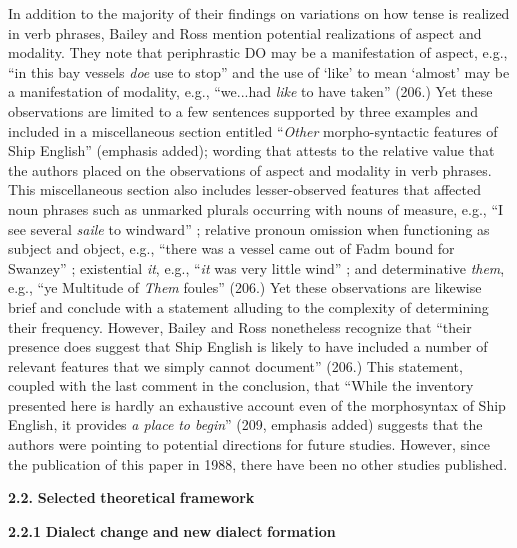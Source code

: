 In addition to the majority of their findings on variations on how tense is realized in verb phrases, Bailey and Ross mention potential realizations of aspect and modality. They note that periphrastic DO may be a manifestation of aspect, e.g., “in this bay vessels \textit{doe} use to stop”  and the use of ‘like’ to mean ‘almost’ may be a manifestation of modality, e.g., “we...had \textit{like} to have taken” (206.) Yet these observations are limited to a few sentences supported by three examples and included in a miscellaneous section entitled “\textit{Other} morpho-syntactic features of Ship English” (emphasis added); wording that attests to the relative value that the authors placed on the observations of aspect and modality in verb phrases. This miscellaneous section also includes lesser-observed features that affected noun phrases such as unmarked plurals occurring with nouns of measure, e.g., “I see several \textit{saile} to windward” ; relative pronoun omission when functioning as subject and object, e.g., “there was a vessel came out of Fadm bound for Swanzey” ; existential \textit{it}, e.g., “\textit{it} was very little wind” ; and determinative \textit{them}, e.g., “ye Multitude of \textit{Them} foules” (206.) Yet these observations are likewise brief and conclude with a statement alluding to the complexity of determining their frequency. However, Bailey and Ross nonetheless recognize that “their presence does suggest that Ship English is likely to have included a number of relevant features that we simply cannot document” (206.) This statement, coupled with the last comment in the conclusion, that “While the inventory presented here is hardly an exhaustive account even of the morphosyntax of Ship English, it provides \textit{a place} \textit{to begin}” (209, emphasis added) suggests that the authors were pointing to potential directions for future studies. However, since the publication of this paper in 1988, there have been no other studies published.  

\textbf{2.2.} \textbf{Selected} \textbf{theoretical} \textbf{framework}

  \textbf{2.2.1} \textbf{Dialect} \textbf{change} \textbf{and} \textbf{new} \textbf{dialect} \textbf{formation} 

